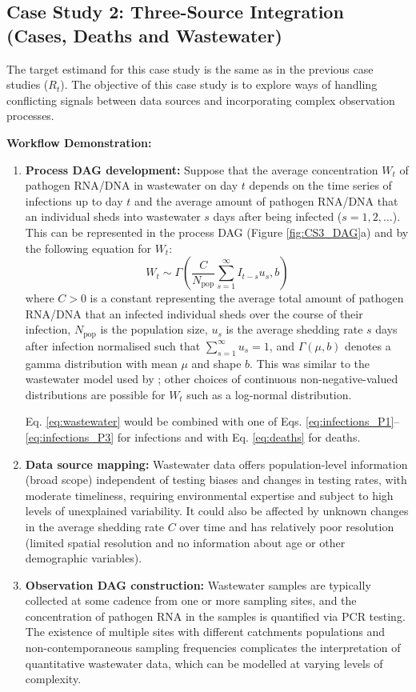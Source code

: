 \documentclass{article}
\begin{document}
\subsection{Case Study 2: Three-Source Integration (Cases, Deaths and Wastewater)}

The target estimand for this case study is the same as in the previous case studies ($R_t$). The objective of this case study is to explore ways of handling conflicting signals between data sources and incorporating complex observation processes.

\textbf{Workflow Demonstration:}
\begin{enumerate}
    \item \textbf{Process DAG development:} 
    Suppose that the average concentration $W_t$ of pathogen RNA/DNA in wastewater on day $t$ depends on the time series of infections up to day $t$ and the average amount of pathogen RNA/DNA that an individual sheds into wastewater $s$ days after being infected ($s=1,2,\ldots$). This can be represented in the process DAG (Figure \ref{fig:CS3_DAG}a) and by the following equation for $W_t$:
    \begin{equation} \label{eq:wastewater}
        W_t \sim \Gamma\left( \frac{C}{N_\mathrm{pop}}\sum_{s=1}^\infty I_{t-s}u_s, b   \right)
    \end{equation}
    where $C>0$ is a constant representing the average total amount of pathogen RNA/DNA that an infected individual sheds over the course of their infection, $N_\mathrm{pop}$ is the population size, $u_s$ is the average shedding rate $s$ days after infection normalised such that $\sum_{s=1}^\infty u_s=1$, and $\Gamma(\mu,b)$ denotes a gamma distribution with mean $\mu$ and shape $b$. This was similar to the wastewater model used by \cite{watson2024jointly}; other choices of continuous non-negative-valued distributions are possible for $W_t$ such as a log-normal distribution.

    Eq. \eqref{eq:wastewater} would be combined with one of Eqs. \eqref{eq:infections_P1}--\eqref{eq:infections_P3} for infections and with Eq. \eqref{eq:deaths} for deaths.
    \item \textbf{Data source mapping:} Wastewater data offers population-level information (broad scope) independent of testing biases and changes in testing rates, with moderate timeliness, requiring environmental expertise and subject to high levels of unexplained variability. It could also be affected by unknown changes in the average shedding rate $C$ over time and has relatively poor resolution (limited spatial resolution and no information about age or other demographic variables). 
    \item \textbf{Observation DAG construction:} 
   Wastewater samples are typically collected at some cadence from one or more sampling sites, and the concentration of pathogen RNA in the samples is quantified via PCR testing. 
   The existence of multiple sites with different catchments populations and non-contemporaneous sampling frequencies complicates the interpretation of quantitative wastewater data, which can be modelled at varying levels of complexity.  
   

\end{enumerate}
\end{document}
